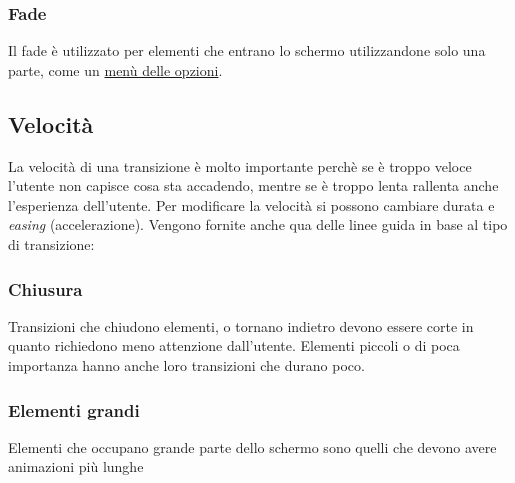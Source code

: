 \documentclass[12pt, a4paper]{report}
\begin{document}
		\subsubsection{Fade}
			Il fade è utilizzato per elementi che entrano lo schermo utilizzandone solo una parte, come un \href{https://kstatic.googleusercontent.com/files/4bf2ddbf50d779f37d88f276b831fad1aad78a23379a87d2b715dbb90d878897d1ad5edcf03385e1814d2ec3f4e9f152fd736ab2727d7f0e0d8b58467eb41057}{menù delle opzioni}.
	\subsection{Velocità}
		La velocità di una transizione è molto importante perchè se è troppo veloce l'utente non capisce cosa sta accadendo, mentre se è troppo lenta rallenta anche l'esperienza dell'utente.
		Per modificare la velocità si possono cambiare durata e \textit{easing} (accelerazione). Vengono fornite anche qua delle linee guida in base al tipo di transizione:
		\subsubsection{Chiusura}
		Transizioni che chiudono elementi, o tornano indietro devono essere corte in quanto richiedono meno attenzione dall'utente.
		Elementi piccoli o di poca importanza hanno anche loro transizioni che durano poco.
		\subsubsection{Elementi grandi}
		Elementi che occupano grande parte dello schermo sono quelli che devono avere animazioni più lunghe
\end{document}
